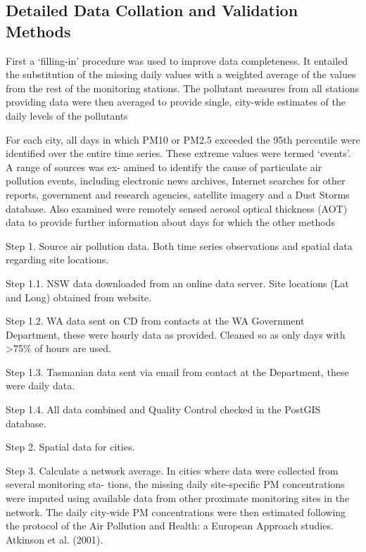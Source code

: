 \subsection{Detailed Data Collation and Validation
Methods}\label{detailed-data-collation-and-validation-methods}

First a `filling-in' procedure was used to improve data completeness. It
entailed the substitution of the missing daily values with a weighted
average of the values from the rest of the monitoring stations. The
pollutant measures from all stations providing data were then averaged
to provide single, city-wide estimates of the daily levels of the
pollutants

For each city, all days in which PM10 or PM2.5 exceeded the 95th
percentile were identified over the entire time series. These extreme
values were termed `events'. A range of sources was ex- amined to
identify the cause of particulate air pollution events, including
electronic news archives, Internet searches for other reports,
government and research agencies, satellite imagery and a Dust Storms
database. Also examined were remotely sensed aerosol optical thickness
(AOT) data to provide further information about days for which the other
methods

Step 1. Source air pollution data. Both time series observations and
spatial data regarding site locations.

Step 1.1. NSW data downloaded from an online data server. Site locations
(Lat and Long) obtained from website.

Step 1.2. WA data sent on CD from contacts at the WA Government
Department, these were hourly data as provided. Cleaned so as only days
with \textgreater{}75\% of hours are used.

Step 1.3. Tasmanian data sent via email from contact at the Department,
these were daily data.

Step 1.4. All data combined and Quality Control checked in the PostGIS
database.

Step 2. Spatial data for cities.

Step 3. Calculate a network average. In cities where data were collected
from several monitoring sta- tions, the missing daily site-specific PM
concentrations were imputed using available data from other proximate
monitoring sites in the network. The daily city-wide PM concentrations
were then estimated following the protocol of the Air Pollution and
Health: a European Approach studies. Atkinson et al. (2001).

